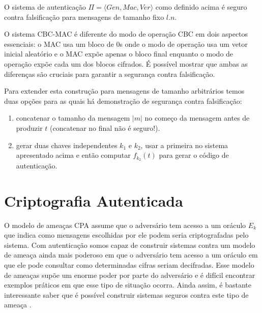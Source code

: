 \begin{theorem}
  O sistema de autenticação $\Pi = \langle Gen, Mac, Ver \rangle$ como definido acima é seguro contra falsificação para mensagens de tamanho fixo $l.n$.
\end{theorem}

O sistema CBC-MAC é diferente do modo de operação CBC em dois aspectos essenciais: o MAC usa um bloco de $0$s onde o modo de operação usa um vetor inicial aleatório e o MAC expõe apenas o bloco final enquanto o modo de operação expõe cada um dos blocos cifrados.
É possível mostrar que ambas as diferenças são cruciais para garantir a segurança contra falsificação.

Para extender esta construção para mensagens de tamanho arbitrários temos duas opções para as quais há demonstração de segurança contra falsificação:
\begin{enumerate}
\item concatenar o tamanho da mensagem $|m|$ no começo da mensagem antes de produzir $t$ (concatenar no final não é seguro!).
\item gerar duas chaves independentes $k_1$ e $k_2$, usar a primeira no sistema apresentado acima e então computar $f_{k_2}(t)$ para gerar o código de autenticação.
\end{enumerate}

\section{Criptografia Autenticada}
\label{label}

O modelo de ameaças CPA assume que o adversário tem acesso a um oráculo $E_k$ que indica como mensagens escolhidas por ele podem seria criptografadas pelo sistema.
Com autenticação somos capaz de construir sistemas contra um modelo de ameaça ainda mais poderoso em que o adversário tem acesso a um oráculo em que ele pode consultar como determinadas cifras seriam decifradas.
Esse modelo de ameaças supõe um enorme poder por parte do adversário e é difícil encontrar exemplos práticos em que esse tipo de situação ocorra.
Ainda assim, é bastante interessante saber que é possível construir sistemas seguros contra este tipo de ameaça \cite{Naor90}.

